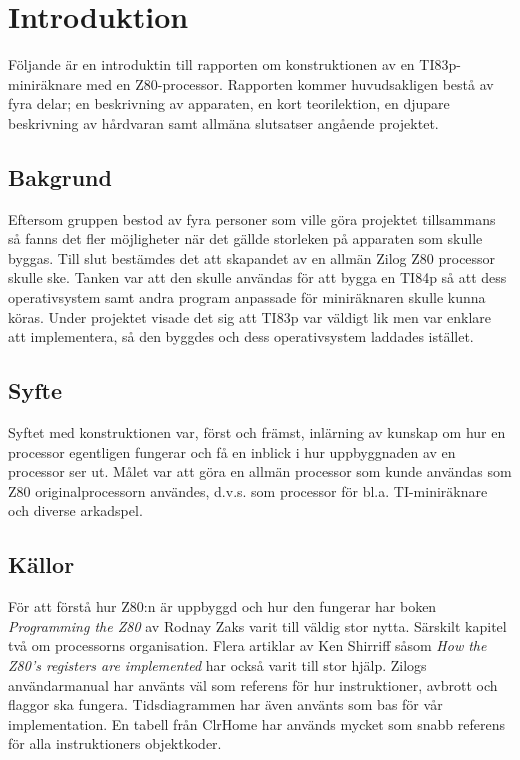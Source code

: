 \documentclass[main.tex]{subfiles}
\begin{document}
\section{Introduktion}
Följande är en introduktin till rapporten om konstruktionen av en
TI83p-miniräknare med en Z80-processor. Rapporten kommer huvudsakligen bestå av
fyra delar; en beskrivning av apparaten, en kort teorilektion, en djupare
beskrivning av hårdvaran samt allmäna slutsatser angående projektet.
\subsection{Bakgrund}
Eftersom gruppen bestod av fyra personer som ville göra projektet tillsammans
så fanns det fler möjligheter när det gällde storleken på apparaten som skulle
byggas. Till slut bestämdes det att skapandet av en allmän Zilog Z80 processor
skulle ske. Tanken var att den skulle användas för att bygga en TI84p så att
dess operativsystem samt andra program anpassade för miniräknaren skulle kunna
köras. Under projektet visade det sig att TI83p var väldigt lik men var enklare
att implementera, så den byggdes och dess operativsystem laddades istället.
\subsection{Syfte}
Syftet med konstruktionen var, först och främst, inlärning av kunskap om hur en
processor egentligen fungerar och få en inblick i hur uppbyggnaden av en
processor ser ut. Målet var att göra en allmän processor som kunde användas som
Z80 originalprocessorn användes, d.v.s. som processor för bl.a. TI-miniräknare
och diverse arkadspel.
\subsection{Källor}
För att förstå hur Z80:n är uppbyggd och hur den fungerar har boken {\it
Programming the Z80} \cite{zaks-z80prog} av Rodnay Zaks varit till väldig stor
nytta. Särskilt kapitel två om processorns organisation. Flera artiklar av Ken
Shirriff såsom {\it How the Z80's registers are implemented}
\cite{shirriff-reg} har också varit till stor hjälp. Zilogs användarmanual
\cite{z80um} har använts väl som referens för hur instruktioner, avbrott och
flaggor ska fungera. Tidsdiagrammen har även använts som bas för vår
implementation. En tabell från ClrHome \cite{clrhome} har används mycket som
snabb referens för alla instruktioners objektkoder.
\end{document}
